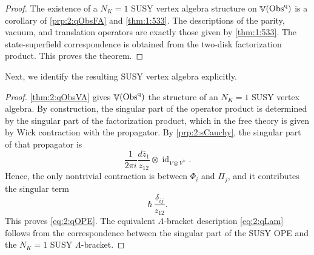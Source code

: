 \documentclass[final,reqno]{amsart}
\numberwithin{equation}{section}
\theoremstyle{definition}
\newtheorem{cor}[thm]{Corollary}
\newcommand{\ol}{\overline}
\newcommand{\ceq}{\coloneqq} %
\newcommand{\qObs}[1]{\mathop{\Obs^{\textup{q}}_{#1}}}
\DeclareMathOperator{\id}{id}
\DeclareMathOperator{\bbV}{\mathbb{V}}
\DeclareMathOperator{\Obs}{Obs}
\begin{document}
\begin{proof}
The existence of a $N_K=1$ SUSY vertex algebra structure on $\bbV(\qObs{})$
is a corollary of \cref{prp:2:qObsFA} and \cref{thm:1:533}.
The descriptions of the parity, vacuum, and translation operators are 
exactly those given by \cref{thm:1:533}. 
The state-superfield correspondence is obtained from 
the two-disk factorization product. 
This proves the theorem.
\end{proof}

Next, we identify the resulting SUSY vertex algebra explicitly. 


\begin{proof}
\cref{thm:2:qObsVA} gives $\bbV(\qObs{})$ 
the structure of an $N_K=1$ SUSY vertex algebra. 
By construction, the singular part of the operator product is 
determined by the singular part of the factorization product, 
which in the free theory is given by Wick contraction with the propagator. 
By \cref{prp:2:sCauchy}, the singular part of that propagator is
\[
 \frac{1}{2\pi i}\frac{d\ol{z}_1}{z_{12}} \otimes \id_{V \otimes V^\vee}.
\]
Hence, the only nontrivial contraction is between $\Phi_i$ and $\Pi_j$, 
and it contributes the singular term
\[
 \hbar\,\frac{\delta_{ij}}{z_{12}}.
\]
This proves \eqref{eq:2:qOPE}. 
The equivalent $\Lambda$-bracket description \eqref{eq:2:qLam} 
follows from the correspondence  \cite[\S3.2.1, \S4.2]{HK} between 
the singular part of the SUSY OPE and the $N_K=1$ SUSY $\Lambda$-bracket.
\end{proof}
\end{document}
